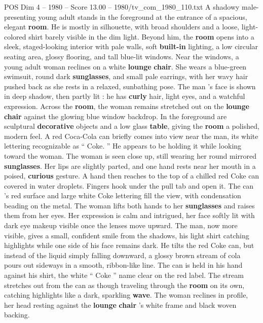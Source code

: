 \begin{textsample}{POS Dim 4 – 1980 – Score 13.00 – 1980/tv\_com\_1980\_110.txt}  \label{ex:f4_pos_048}
A shadowy male-presenting young adult stands in the foreground at the entrance of a spacious, elegant \textbf{room}.
He is mostly in silhouette, with broad shoulders and a loose, light-colored shirt barely visible in the dim light.
Beyond him, the \textbf{room} opens into a sleek, staged-looking interior with pale walls, soft \textbf{built-in} lighting, a low circular seating area, glossy flooring, and tall blue-lit windows.
Near the windows, a young adult woman reclines on a white \textbf{lounge} \textbf{chair}.
She wears a blue-green swimsuit, round dark \textbf{sunglasses}, and small pale earrings, with her wavy hair pushed back as she rests in a relaxed, sunbathing pose.
The man ’s face is shown in deep shadow, then partly lit : he has \textbf{curly} hair, light eyes, and a watchful expression.
Across the \textbf{room}, the woman remains stretched out on the \textbf{lounge} \textbf{chair} against the glowing blue window backdrop.
In the foreground are sculptural \textbf{decorative} objects and a low glass \textbf{table}, giving the \textbf{room} a polished, modern feel.
A red Coca-Cola can briefly comes into view near the man, its white lettering recognizable as “ Coke. ” He appears to be holding it while looking toward the woman.
The woman is seen close up, still wearing her round mirrored \textbf{sunglasses}.
Her lips are slightly parted, and one hand rests near her mouth in a poised, \textbf{curious} gesture.
A hand then reaches to the top of a chilled red Coke can covered in water droplets.
Fingers hook under the pull tab and open it.
The can ’s red surface and large white Coke lettering fill the view, with condensation beading on the metal.
The woman lifts both hands to her \textbf{sunglasses} and raises them from her eyes.
Her expression is calm and intrigued, her face softly lit with dark eye makeup visible once the lenses move upward.
The man, now more visible, gives a small, confident smile from the shadows, his light shirt catching highlights while one side of his face remains dark.
He tilts the red Coke can, but instead of the liquid simply falling downward, a glossy brown stream of cola pours out sideways in a smooth, ribbon-like line.
The can is held in his hand against his shirt, the white “ Coke ” name clear on the red label.
The stream stretches out from the can as though traveling through the \textbf{room} on its own, catching highlights like a dark, sparkling \textbf{wave}.
The woman reclines in profile, her head resting against the \textbf{lounge} \textbf{chair} ’s white frame and black woven backing.

\end{textsample}

